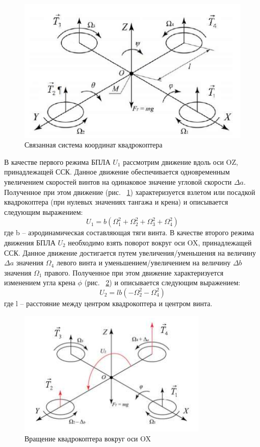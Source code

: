 \begin{figure}[H]
	\centering
	\includegraphics[width=0.5\linewidth]{pics/ris1}
	\caption{Связанная система координат квадрокоптера
	}
	\label{fig:ris1} %
\end{figure}
В качестве первого режима БПЛА \(U_{1}\) рассмотрим движение вдоль оси OZ, принадлежащей ССК. Данное движение обеспечивается одновременным увеличением скоростей винтов на одинаковое значение угловой скорости \(\Delta a\). Полученное при этом движение (рис. ~\ref{fig:ris1}) характеризуется взлетом или посадкой квадрокоптера (при нулевых значениях тангажа и крена) и описывается следующим выражением:
\begin{equation}
U_{1}=b(\Omega_{1}^2+\Omega_{2}^2+\Omega_{3}^2+\Omega_{4}^2)
\end{equation}
где b – аэродинамическая составляющая тяги винта.
В качестве второго режима движения БПЛА \(U_{2}\) необходимо взять поворот вокруг оси OX, принадлежащей ССК. Данное движение достигается путем увеличения/уменьшения на величину \(\Delta a\) значения \(\Omega_{4}\) левого винта и уменьшением/увеличением на величину \(\Delta b\) значения \(\Omega_{1}\)
правого. Полученное при этом движение характеризуется изменением угла крена \(\phi\) (рис. ~\ref{fig:ris2}) и описывается следующим выражением:
\begin{equation}
U_{2}=lb(-\Omega_{2}^2-\Omega_{4}^2)
\end{equation}
где l – расстояние между центром квадрокоптера и центром винта.
\begin{figure}[H]
	\centering
	\includegraphics[width=0.5\linewidth]{pics/ris2}
	\caption{Вращение квадрокоптера вокруг оси OX
	}
	\label{fig:ris2} %
\end{figure}
